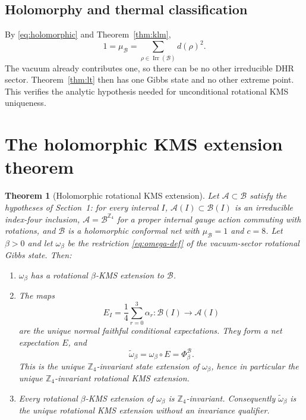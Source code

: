 \documentclass[11pt]{article}
\newtheorem{theorem}{Theorem}[section]
\theoremstyle{remark}
\newcommand{\A}{\mathcal A}
\newcommand{\B}{\mathcal B}
\newcommand{\Z}{\mathbb Z}
\begin{document}
\subsection{Holomorphy and thermal classification}

By \eqref{eq:holomorphic} and Theorem~\ref{thm:klm},
\[
 1=\mu_{\B}
 =\sum_{\rho\in\operatorname{Irr}(\B)}d(\rho)^2.
\tag{3.9}\label{eq:one-sector}
\]
The vacuum already contributes one, so there can be no other
irreducible DHR sector.  Theorem~\ref{thm:lt} then has one Gibbs
state and no other extreme point.  This verifies the analytic
hypothesis needed for unconditional rotational KMS uniqueness.

\section{The holomorphic KMS extension theorem}

\begin{theorem}[Holomorphic rotational KMS extension]
\label{thm:main}
Let $\A\subset\B$ satisfy the hypotheses of Section~1: for every
interval $I$, $\A(I)\subset\B(I)$ is an irreducible index-four
inclusion, $\A=\B^{\Z_4}$ for a proper internal gauge action
commuting with rotations, and $\B$ is a holomorphic conformal net
with $\mu_{\B}=1$ and $c=8$.  Let $\beta>0$ and let
$\omega_\beta$ be the restriction \eqref{eq:omega-def} of the
vacuum-sector rotational Gibbs state.  Then:
\begin{enumerate}[label=\textup{(\alph*)}]
\item $\omega_\beta$ has a rotational $\beta$-KMS extension to
  $\B$.
\item The maps
  \[
    E_I=\frac14\sum_{r=0}^{3}\alpha_r:
    \B(I)\to\A(I)
  \]
  are the unique normal faithful conditional expectations.  They
  form a net expectation $E$, and
  \[
    \widetilde\omega_\beta
    =\omega_\beta\circ E
    =\Phi_\beta^{\B}.
  \tag{4.1}\label{eq:main-extension}
  \]
  This is the unique $\Z_4$-invariant state extension of
  $\omega_\beta$, hence in particular the unique
  $\Z_4$-invariant rotational KMS extension.
\item Every rotational $\beta$-KMS extension of $\omega_\beta$ is
  $\Z_4$-invariant.  Consequently
  $\widetilde\omega_\beta$ is the unique rotational KMS extension
  without an invariance qualifier.
\end{enumerate}
\end{theorem}
\end{document}
